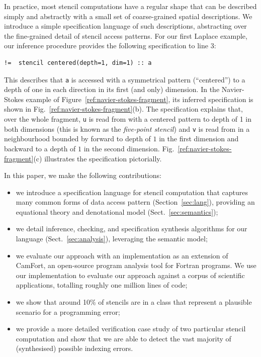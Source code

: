 \documentclass[9pt]{sigplanconf}
\theoremstyle{definition}
\begin{document}
In practice, most stencil computations have a regular shape that can
be described simply and abstractly with a small set of coarse-grained
spatial descriptions. We introduce a simple specification language of
such descriptions, abstracting over the fine-grained detail of stencil
access patterns. For our first Laplace example, our
inference procedure provides the following specification to line 3:
%
\begin{verbatim}
!=  stencil centered(depth=1, dim=1) :: a
\end{verbatim}
%
This describes that \texttt{a} is accessed with a
symmetrical pattern (``centered'') to a depth of one in each
direction in its first (and only) dimension.
In the Navier-Stokes example of
Figure~\ref{ref:navier-stokes-fragment}, its inferred specification is shown
in Fig.~\ref{ref:navier-stokes-fragment}(b). The
specification explains that, over the whole fragment, \texttt{u} is
read from with a centered pattern to depth of 1 in both dimensions
(this is known as the \emph{five-point stencil}) and \texttt{v}
is read from in a neighbourhood bounded by forward to depth of $1$ in
the first dimension and backward to a depth of $1$ in the second
dimension. Fig.~\ref{ref:navier-stokes-fragment}(c) illustrates
the specification pictorially.

In this paper, we make the following contributions:
%
\begin{itemize}[leftmargin=0.8em]
\item we introduce a specification language for
stencil computation that captures many common forms
of data access pattern (Section~\ref{sec:lang}), providing
 an equational theory and denotational model (Sect.~\ref{sec:semantics});

\item we detail inference, checking, and specification synthesis 
algorithms for our language (Sect.~\ref{sec:analysis}), leveraging the semantic model;

\item we evaluate our approach with an
implementation as an extension of CamFort,
an open-source program analysis tool for Fortran
programs. We use our implementation to evaluate our approach against
a corpus of scientific applications, totalling roughly one million
lines of code; 

\item we show that around 10\% of stencils are in a class that
  represent a plausible scenario for a programming error;

\item we provide a more detailed verification case study of two
  particular stencil computation and show that we
  are able to detect the vast majority of (synthesised) possible
  indexing errors.
\end{itemize}
%
\end{document}
